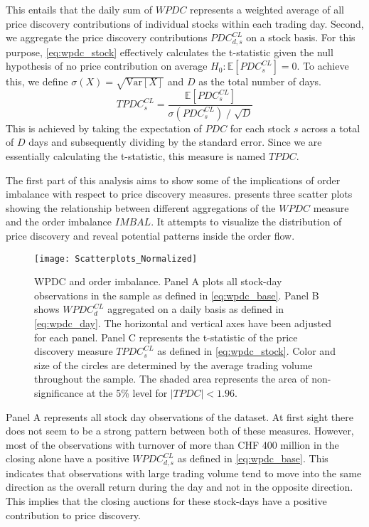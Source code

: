 \documentclass[11pt,a4paper]{article}
\begin{document}
    This entails that the daily sum of $WPDC$ represents a weighted average of all price discovery contributions of individual stocks within each trading day. Second, we aggregate the price discovery contributions $PDC^{CL}_{d,s}$ on a stock basis. For this purpose, \cref{eq:wpdc_stock} effectively calculates the t-statistic given the null hypothesis of no price contribution on average $H_0: \mathbb{E}\left[  PDC^{CL}_{s} \right] = 0$. To achieve this, we define $\sigma (X) = \sqrt{ \text{Var} \left[ X \right] }$ and $D$ as the total number of days.
    \begin{equation}
        \label{eq:wpdc_stock}
        TPDC^{CL}_{s} =  \frac{\mathbb{E} \left[  PDC^{CL}_{s} \right] }{ \sigma \left( PDC^{CL}_{s} \right) \; / \; \sqrt{D}}
    \end{equation}
    This is achieved by taking the expectation of $PDC$ for each stock $s$ across a total of $D$ days and subsequently dividing by the standard error.
    Since we are essentially calculating the t-statistic, this measure is named $TPDC$.


    The first part of this analysis aims to show some of the implications of order imbalance with respect to price discovery measures.  presents three scatter plots showing the relationship between different aggregations of the $WPDC$ measure and the order imbalance $IMBAL$. It attempts to visualize the distribution of price discovery and reveal potential patterns inside the order flow.

    \begin{figure}[!t]
        \centering
        \texttt{[image: Scatterplots\_Normalized]}
        \caption{\ac{WPDC} and order imbalance. Panel A plots all stock-day observations in the sample as defined in \cref{eq:wpdc_base}. Panel B shows $WPDC^{CL}_d$ aggregated on a daily basis as defined in \cref{eq:wpdc_day}. The horizontal and vertical axes have been adjusted for each panel. Panel C represents the t-statistic of the price discovery measure $TPDC^{CL}_s$ as defined in \cref{eq:wpdc_stock}. Color and size of the circles are determined by the average trading volume throughout the sample. The shaded area represents the area of non-significance at the 5\% level for $| TPDC | < 1.96$. }
        \label{fig:Discovery}
    \end{figure}

    Panel A represents all stock day observations of the dataset. At first sight there does not seem to be a strong pattern between both of these measures. However, most of the observations with turnover of more than CHF 400 million in the closing alone have a positive $WPDC^{CL}_{d,s}$ as defined in \cref{eq:wpdc_base}. This indicates that observations with large trading volume tend to move into the same direction as the overall return during the day and not in the opposite direction. This implies that the closing auctions for these stock-days have a positive contribution to price discovery.
\end{document}
